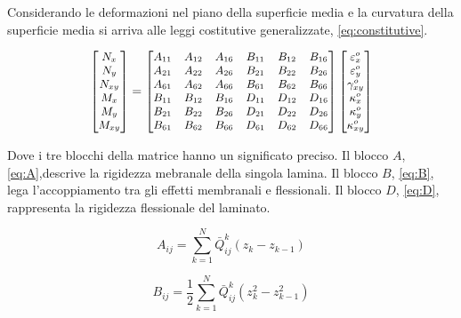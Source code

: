 \documentclass[a4paper,num-refs]{oup-contemporary}
\begin{document}
Considerando le deformazioni nel piano della superficie media e la curvatura della superficie media si arriva alle leggi costitutive generalizzate, \cref{eq:constitutive}.

\begin{equation}
	\small{
\left[\begin{matrix}
	N_{x} \\
	N_{y} \\
	N_{x y} \\
	M_{x} \\
	M_{y} \\
	M_{x y}
\end{matrix}\right]=\left[\begin{matrix}
	A_{11} & A_{12} & A_{16} & B_{11} & B_{12} & B_{16} \\
	A_{21} & A_{22} & A_{26} & B_{21} & B_{22} & B_{26} \\
	A_{61} & A_{62} & A_{66} & B_{61} & B_{62} & B_{66} \\
 B_{11} & B_{12} & B_{16} & D_{11} & D_{12} & D_{16} \\
	B_{21} & B_{22} & B_{26} & D_{21} & D_{22} & D_{26} \\
	B_{61} & B_{62} & B_{66} & D_{61} & D_{62} & D_{66}
\end{matrix}\right]\left[\begin{matrix}
	\varepsilon_{x}^{o} \\
	\varepsilon_{y}^{o} \\
	\gamma_{x y}^{o} \\
	\kappa_{x}^{o} \\
	\kappa_{y}^{o} \\
	\kappa_{x y}^{o}
\end{matrix}\right]}
\label{eq:constitutive}
\end{equation}

Dove i tre blocchi della matrice hanno un significato preciso. Il blocco $A$, \cref{eq:A},descrive la rigidezza mebranale della singola lamina. Il blocco $B$, \cref{eq:B}, lega l'accoppiamento tra gli effetti membranali e flessionali. Il blocco $D$, \cref{eq:D}, rappresenta la rigidezza flessionale del laminato.


\begin{equation}
A_{i j}=\sum_{k=1}^{N} \bar{Q}_{i j}^{k}\left(z_{k}-z_{k-1}\right)
\label{eq:A}
\end{equation}

\begin{equation}
B_{i j}=\frac{1}{2} \sum_{k=1}^{N} \bar{Q}_{i j}^{k}\left(z_{k}^{2}-z_{k-1}^{2}\right)
\label{eq:B}
\end{equation}
\end{document}
